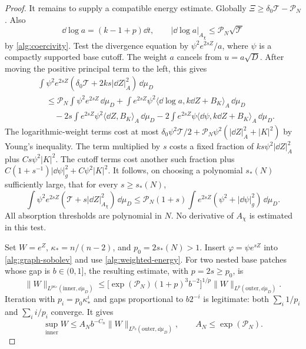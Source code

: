 \begin{proof}
It remains to supply a compatible energy estimate.  Globally
$\Xi\geq\delta_0\mathcal T-\mathcal P_N$.  Also
\[
 \dd\log a=(k-1+p)\dd t,\qquad
 |\dd\log a|_{A_\chi}\leq\mathcal P_N\sqrt{\mathcal T}
\]
by \eqref{alg:coercivity}.  Test the divergence equation by
$\psi^2e^{2sZ}/a$, where $\psi$ is a compactly supported base cutoff.
The weight $a$ cancels from $u=a\sqrt D$.  After moving the positive
principal term to the left, this gives
\begin{align*}
 &\int\psi^2e^{2sZ}
       (\delta_0\mathcal T+2ks|\dd Z|_A^2)\,\dd\mu_D\\
 &\quad\leq\mathcal P_N\int\psi^2e^{2sZ}\,\dd\mu_D
 +\int e^{2sZ}\psi^2\langle\dd\log a,k\dd Z+B_K\rangle_A\,\dd\mu_D\\
 &\qquad-2s\int e^{2sZ}\psi^2\langle\dd Z,B_K\rangle_A\,\dd\mu_D
 -2\int e^{2sZ}\psi\langle\dd\psi,k\dd Z+B_K\rangle_A\,\dd\mu_D.
\end{align*}
The logarithmic-weight terms cost at most
$\delta_0\psi^2\mathcal T/2+
 \mathcal P_N\psi^2(|\dd Z|_A^2+|K|^2)$ by Young's inequality.
The term multiplied by $s$ costs a fixed fraction of
$ks\psi^2|\dd Z|_A^2$ plus $Cs\psi^2|K|^2$.  The cutoff terms cost
another such fraction plus $C(1+s^{-1})|\dd\psi|_g^2+C\psi^2|K|^2$.
It follows, on choosing a polynomial $s_*(N)$ sufficiently large,
that for every $s\geq s_*(N)$,
\begin{equation}
 \int\psi^2e^{2sZ}
      (\mathcal T+s|\dd Z|_{A_\chi}^2)\,\dd\mu_D
 \leq\mathcal P_N(1+s)
       \int e^{2sZ}(\psi^2+|\dd\psi|_g^2)\,\dd\mu_D.
 \label{alg:weighted-energy}
\end{equation}
All absorption thresholds are polynomial in $N$.  No derivative of
$A_\chi$ is estimated in this test.

Set $W=e^Z$, $\kappa_*=n/(n-2)$, and $p_0=2s_*(N)>1$.
Insert $\varphi=\psi e^{sZ}$ into
\eqref{alg:graph-sobolev} and use \eqref{alg:weighted-energy}.
For two nested base patches whose gap is $b\in(0,1]$, the resulting
estimate, with $p=2s\geq p_0$, is
\begin{equation}
 \|W\|_{L^{p\kappa_*}(\mathrm{inner},\dd\mu_D)}
 \leq\bigl[\exp(\mathcal P_N)(1+p)^3b^{-2}\bigr]^{1/p}
          \|W\|_{L^p(\mathrm{outer},\dd\mu_D)}.
 \label{alg:moser-step}
\end{equation}
Iteration with $p_i=p_0\kappa_*^i$ and gaps proportional to
$b2^{-i}$ is legitimate: both $\sum_i1/p_i$ and $\sum_i i/p_i$
converge.  It gives
\begin{equation}
 \sup_{\mathrm{inner}}W
 \leq A_Nb^{-C_n}\|W\|_{L^{p_0}(\mathrm{outer},\dd\mu_D)},
 \qquad A_N\leq\exp(\mathcal P_N).
 \label{alg:moser-sup}
\end{equation}


\end{proof}
